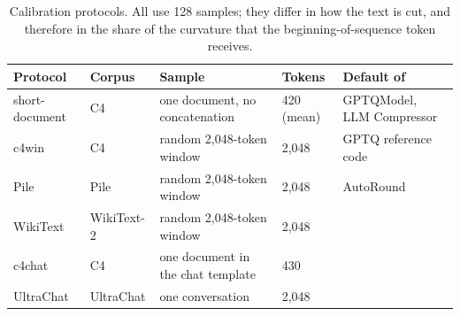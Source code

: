 \begin{table}[t]
\caption{Calibration protocols. All use 128 samples; they differ in how the text is cut, and therefore in the share of the curvature that the beginning-of-sequence token receives.}
\label{tab:protocols}
\begin{center}
\footnotesize\setlength{\tabcolsep}{4pt}\begin{tabular}{ll>{\raggedright\arraybackslash}p{3.6cm}l>{\raggedright\arraybackslash}p{3.0cm}}
\toprule
Protocol & Corpus & Sample & Tokens & Default of \\
\midrule
short-document & C4        & one document, no concatenation & 420 (mean) & GPTQModel, LLM Compressor \\
c4win          & C4        & random 2,048-token window      & 2,048      & GPTQ reference code \\
Pile           & Pile      & random 2,048-token window      & 2,048      & AutoRound \\
WikiText       & WikiText-2 & random 2,048-token window     & 2,048      & \\
c4chat         & C4        & one document in the chat template & 430     & \\
UltraChat      & UltraChat & one conversation               & 2,048      & \\
\bottomrule
\end{tabular}
\end{center}
\end{table}
